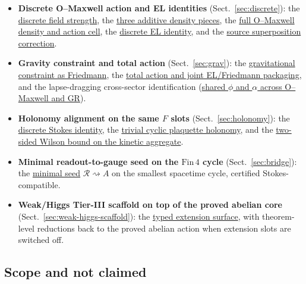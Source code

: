 \documentclass[11pt]{amsart}
\begin{document}
\begin{itemize}
\item \textbf{Discrete O--Maxwell action and EL identities} (Sect.~\ref{sec:discrete}): the \hyperref[lean:F-from-A]{discrete field strength}, the \hyperref[lean:LO-kinetic]{three additive density pieces}, the \hyperref[lean:LO-Maxwell]{full O--Maxwell density and action cell}, the \hyperref[lean:EL-divergence]{discrete EL identity}, and the \hyperref[lean:add-J]{source superposition correction}.
\item \textbf{Gravity constraint and total action} (Sect.~\ref{sec:grav}): the \hyperref[lean:S-grav]{gravitational constraint as Friedmann}, the \hyperref[lean:total-action]{total action and joint EL/Friedmann packaging}, and the lapse-dragging cross-sector identification (\hyperref[lean:lapse-bridge]{shared \(\phi\) and \(\alpha\) across O--Maxwell and GR}).
\item \textbf{Holonomy alignment on the same \(F\) slots} (Sect.~\ref{sec:holonomy}): the \hyperref[lean:cyclic-flux]{discrete Stokes identity}, the \hyperref[lean:trivial-holonomy]{trivial cyclic plaquette holonomy}, and the \hyperref[lean:wilson-bounds]{two-sided Wilson bound on the kinetic aggregate}.
\item \textbf{Minimal readout-to-gauge seed on the \(\mathrm{Fin}\,4\) cycle} (Sect.~\ref{sec:bridge}): the \hyperref[lean:readout-seed]{minimal seed} \(\mathcal{R}\rightsquigarrow A\) on the smallest spacetime cycle, certified Stokes-compatible.
\item \textbf{Weak/Higgs Tier-III scaffold on top of the proved abelian core} (Sect.~\ref{sec:weak-higgs-scaffold}): the \hyperref[lean:weakHiggs-scaffold]{typed extension surface}, with theorem-level reductions back to the proved abelian action when extension slots are switched off.
\end{itemize}

\subsection{Scope and not claimed}
\label{subsec:not-claimed}
\end{document}

